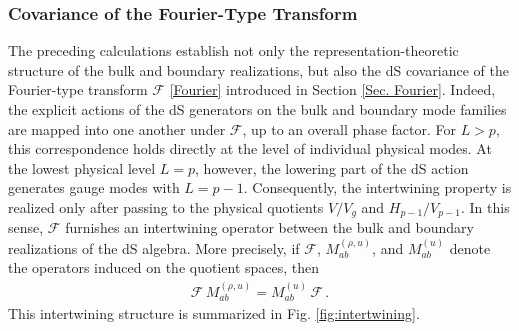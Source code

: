 \documentclass[aps,twocolumn,nofootinbib]{revtex4}
\begin{document}
{\begin{appendix}
\subsubsection{Covariance of the Fourier-Type Transform} 

The preceding calculations establish not only the representation-theoretic structure of the bulk and boundary realizations, but also the dS covariance of the Fourier-type transform $\mathcal{F}$ \eqref{Fourier} introduced in Section \ref{Sec. Fourier}. Indeed, the explicit actions of the dS generators on the bulk and boundary mode families are mapped into one another under $\mathcal{F}$, up to an overall phase factor. For $L>p$, this correspondence holds directly at the level of individual physical modes. At the lowest physical level $L=p$, however, the lowering part of the dS action generates gauge modes with $L=p-1$. Consequently, the intertwining property is realized only after passing to the physical quotients $V/V_g$ and $H_{p-1}/V_{p-1}$. In this sense, $\mathcal{F}$ furnishes an intertwining operator between the bulk and boundary realizations of the dS algebra. More precisely, if $\mathcal{F}$, $M_{ab}^{(\rho,u)}$, and $M_{ab}^{(u)}$ denote the operators induced on the quotient spaces, then
\begin{align}
    \mathcal{F}\, M_{ab}^{(\rho, u)} = M_{ab}^{(u)}\, \mathcal{F} \,.
\end{align}
This intertwining structure is summarized in Fig. \ref{fig:intertwining}. 

\begin{figure}[h]
    \begin{center}
\end{center}
\end{figure}
\end{appendix}}
\end{document}
